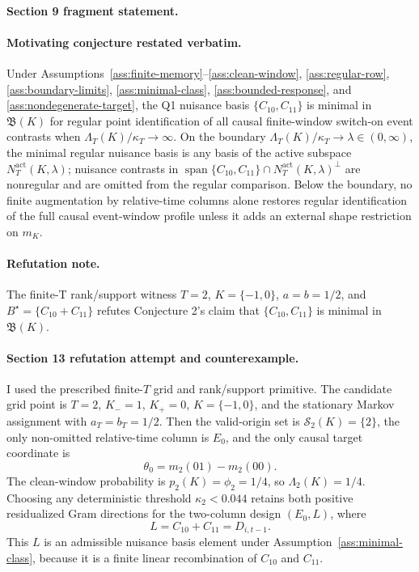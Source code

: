 \paragraph{Section 9 fragment statement.}
\paragraph{Motivating conjecture restated verbatim.}
Under Assumptions~\ref{ass:finite-memory}--\ref{ass:clean-window}, \ref{ass:regular-row}, \ref{ass:boundary-limits}, \ref{ass:minimal-class}, \ref{ass:bounded-response}, and \ref{ass:nondegenerate-target}, the Q1 nuisance basis \(\{C_{10},C_{11}\}\) is minimal in \(\mathfrak B(K)\) for regular point identification of all causal finite-window switch-on event contrasts when \(\Lambda_T(K)/\kappa_T\to\infty\).
On the boundary \(\Lambda_T(K)/\kappa_T\to\lambda\in(0,\infty)\), the minimal regular nuisance basis is any basis of the active subspace \(N_T^{\mathrm{act}}(K,\lambda)\); nuisance contrasts in \(\operatorname{span}\{C_{10},C_{11}\}\cap N_T^{\mathrm{act}}(K,\lambda)^\perp\) are nonregular and are omitted from the regular comparison.
Below the boundary, no finite augmentation by relative-time columns alone restores regular identification of the full causal event-window profile unless it adds an external shape restriction on \(m_K\).

\paragraph{Refutation note.}
The finite-T rank/support witness \(T=2\), \(K=\{-1,0\}\), \(a=b=1/2\), and \(B^\star=\{C_{10}+C_{11}\}\) refutes Conjecture 2's claim that \(\{C_{10},C_{11}\}\) is minimal in \(\mathfrak B(K)\).

\paragraph{Section 13 refutation attempt and counterexample.}
I used the prescribed finite-\(T\) grid and rank/support primitive.
The candidate grid point is \(T=2\), \(K_- =1\), \(K_+=0\), \(K=\{-1,0\}\), and the stationary Markov assignment with \(a_T=b_T=1/2\).
Then the valid-origin set is \(\mathcal S_2(K)=\{2\}\), the only non-omitted relative-time column is \(E_0\), and the only causal target coordinate is
\[
\theta_0=m_2(01)-m_2(00).
\]
The clean-window probability is \(p_2(K)=\phi_2=1/4\), so \(\Lambda_2(K)=1/4\).
Choosing any deterministic threshold \(\kappa_2<0.044\) retains both positive residualized Gram directions for the two-column design \((E_0,L)\), where
\[
L=C_{10}+C_{11}=D_{i,t-1}.
\]
This \(L\) is an admissible nuisance basis element under Assumption~\ref{ass:minimal-class}, because it is a finite linear recombination of \(C_{10}\) and \(C_{11}\).

